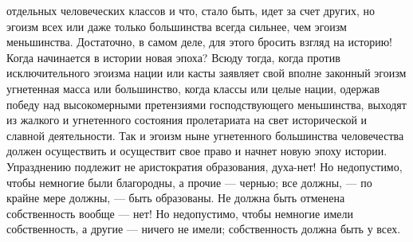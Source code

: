\documentclass[12pt]{article}
\begin{document}
отдельных человеческих классов и что, стало быть, идет за счет других, но эгоизм всех или даже только большинства всегда сильнее, чем эгоизм меньшинства. Достаточно, в самом деле, для этого бросить взгляд на историю! Когда начинается в истории новая эпоха? Всюду тогда, когда против исключительного эгоизма нации или касты заявляет свой вполне законный эгоизм угнетенная масса или большинство, когда классы или целые нации, одержав победу над высокомерными претензиями господствующего меньшинства, выходят из жалкого и угнетенного состояния пролетариата на свет исторической и славной деятельности. Так и эгоизм ныне угнетенного большинства человечества должен осуществить и осуществит свое право и начнет новую эпоху истории. Упразднению подлежит не аристократия образования, духа-нет! Но недопустимо, чтобы немногие были благородны, а прочие --- чернью; все должны, --- по крайне мере должны, --- быть образованы. Не должна быть отменена собственность вообще --- нет! Но недопустимо, чтобы немногие имели собственность, а другие --- ничего не имели; собственность должна быть у всех. 
\end{document}
